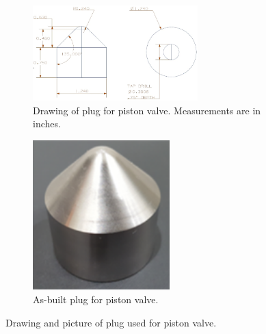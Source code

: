 \begin{figure}[bt]
    \vspace{16pt}
    \centering
    \begin{subfigure}[t]{0.6\textwidth}
        \centering
        \includegraphics[width=0.7\textwidth]{design/photos/plug_gen1_drawing.PNG}
        \caption{Drawing of plug for piston valve. Measurements are in inches.}
        \label{fig:plug draw}
    \end{subfigure}
    \hfill
    \begin{subfigure}[t]{0.35\textwidth}
        \centering
        \includegraphics[width=0.58\textwidth]{design/photos/cobalt_plug.png}
        \caption{As-built plug for piston valve.}
        \label{fig:cobalt plug}
    \end{subfigure}
    \caption{Drawing and picture of plug used for piston valve.}
    \label{fig:plug}
    \vspace{16pt}
\end{figure}



